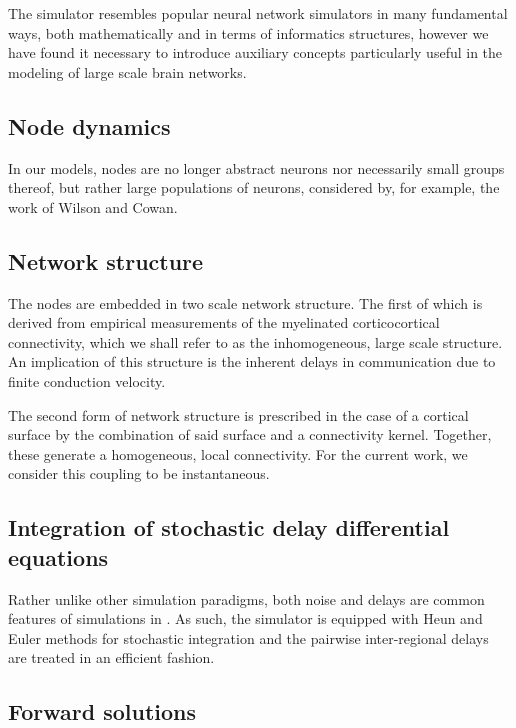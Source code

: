 The \TVB simulator resembles popular neural network simulators in 
many fundamental ways, both mathematically and in terms of informatics 
structures, however we have found it necessary to introduce auxiliary
concepts particularly useful in the modeling of large scale brain 
networks.

\subsection{Node dynamics}

	In our models, nodes are no longer abstract neurons nor necessarily 
	small groups thereof, but rather large populations of neurons, considered
	by, for example, the work of Wilson and Cowan. 


\subsection{Network structure}
	
	The nodes are embedded in two scale network structure. The first of which
	is derived from empirical measurements of the myelinated corticocortical
	connectivity, which we shall refer to as the inhomogeneous, large scale
	structure. An implication of this structure is the inherent delays in 
	communication due to finite conduction velocity.

	The second form of network structure is prescribed in the case of a 
	cortical surface by the combination of said surface and a connectivity
	kernel. Together, these generate a homogeneous, local connectivity. 
	For the current work, we consider this coupling to be instantaneous.


\subsection{Integration of stochastic delay differential equations}

	Rather unlike other simulation paradigms, both noise and delays are
	common features of simulations in \TVB. As such, the simulator is equipped
	with Heun and Euler methods for stochastic integration and the pairwise
	inter-regional delays are treated in an efficient fashion. 



\subsection{Forward solutions}

